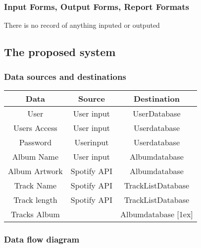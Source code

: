 \subsubsection{Input Forms, Output Forms, Report Formats}
There is no record of anything inputed or outputed 
\subsection{The proposed system}

\subsubsection{Data sources and destinations}
\begin{center}
 \begin{tabular}{||c |c |c ||} \\
 \hline
 Data & Source & Destination   \\ [0.5ex] 
 \hline
 User & User input & UserDatabase  \\ 
 \hline
 Users Access & User input & Userdatabase  \\
 \hline
 Password & Userinput & Userdatabase \\
 \hline
 Album Name & User input & Albumdatabase  \\
 \hline
 Album Artwork & Spotify API & Albumdatabase  \\
 \hline
 Track Name & Spotify API & TrackListDatabase  \\
 \hline
 Track length & Spotify API & TrackListDatabase  \\
 \hline
 Tracks Album &  & Albumdatabase  [1ex] \\
 \hline
\end{tabular}
\end{center}
\subsubsection{Data flow diagram}

